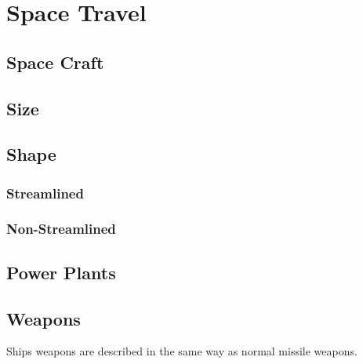 \chapter{Space Travel}
\section{Space Craft}
\section{Size}
\section{Shape}
\subsection{Streamlined}
\subsection{Non-Streamlined}
\section{Power Plants}
\section{Weapons}
Ships weapons are de\-scribed in the same way as nor\-mal mis\-sile weapons.


